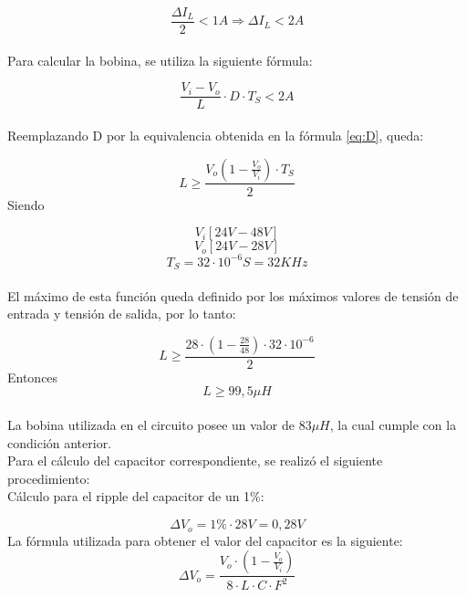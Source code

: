                 \begin{equation}
                    \frac{\Delta I_L}{2} < 1A \Rightarrow \Delta I_L < 2A
                \end{equation}\\
                Para calcular la bobina, se utiliza la siguiente fórmula:\par
                \begin{equation}
                    \frac{V_i - V_o}{L} \cdot D \cdot T_S < 2A
                \end{equation}\\
                Reemplazando D por la equivalencia obtenida en la fórmula \ref{eq:D}, queda:\par
                \begin{equation}
                    L \geq \frac{V_o(1-\frac{V_o}{V_i})\cdot T_S}{2}
                \end{equation}
                Siendo\par
                    \[V_i [24V-48V]\]
                    \[V_o [24V-28V]\]
                    \[T_S = 32 \cdot 10^{-6} S  = 32KHz\]\\
                El máximo de esta función queda definido por los máximos valores de tensión de entrada y tensión de salida, por lo tanto:\par
                \begin{equation}
                    L \geq \frac{28 \cdot (1-\frac{28}{48}) \cdot 32 \cdot 10^{-6}}{2}
                \end{equation}
                Entonces \[L \geq 99,5\mu H\]\\
                La bobina utilizada en el circuito posee un valor de \textbf{$83 \mu H$}, la cual cumple con la condición anterior.\\
                Para el cálculo del capacitor correspondiente, se realizó el siguiente procedimiento:\\
                Cálculo para el ripple del capacitor de un 1\%:\par
                \begin{equation}
                    \Delta V_o = 1\% \cdot 28V = 0,28V
                \end{equation}
                La fórmula utilizada para obtener el valor del capacitor es la siguiente:\\
                \begin{equation}
                    \Delta V_o = \frac{V_o \cdot (1-\frac{V_o}{V_i})}{8 \cdot L \cdot C \cdot F^2}
                \end{equation}\\
